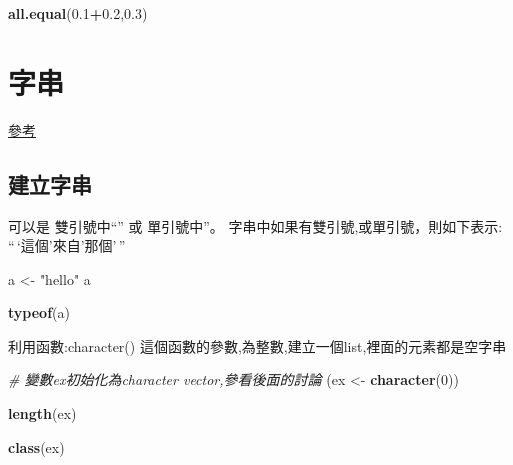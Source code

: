 \documentclass[]{book}
\newenvironment{Shaded}{\begin{snugshade}}{\end{snugshade}}
\newcommand{\KeywordTok}[1]{\textcolor[rgb]{0.13,0.29,0.53}{\textbf{#1}}}
\newcommand{\DecValTok}[1]{\textcolor[rgb]{0.00,0.00,0.81}{#1}}
\newcommand{\FloatTok}[1]{\textcolor[rgb]{0.00,0.00,0.81}{#1}}
\newcommand{\StringTok}[1]{\textcolor[rgb]{0.31,0.60,0.02}{#1}}
\newcommand{\CommentTok}[1]{\textcolor[rgb]{0.56,0.35,0.01}{\textit{#1}}}
\newcommand{\OperatorTok}[1]{\textcolor[rgb]{0.81,0.36,0.00}{\textbf{#1}}}
\newcommand{\NormalTok}[1]{#1}
\theoremstyle{definition}
\theoremstyle{definition}
\theoremstyle{definition}
\theoremstyle{remark}
\begin{document}
\begin{Shaded}
\begin{Highlighting}[]
\KeywordTok{all.equal}\NormalTok{(}\FloatTok{0.1}\OperatorTok{+}\FloatTok{0.2}\NormalTok{,}\FloatTok{0.3}\NormalTok{)}
\end{Highlighting}
\end{Shaded}

\section{字串}

\href{https://www.gastonsanchez.com/r4strings/chars.html}{參考}

\subsection{建立字串}

可以是 雙引號中``'' 或 單引號中''。
字串中如果有雙引號,或單引號，則如下表示:\\
``\,`這個'來自'那個'\,''

\begin{Shaded}
\begin{Highlighting}[]
\NormalTok{a <-}\StringTok{ "hello"}
\NormalTok{a}
\end{Highlighting}
\end{Shaded}

\begin{Shaded}
\begin{Highlighting}[]
\KeywordTok{typeof}\NormalTok{(a)}
\end{Highlighting}
\end{Shaded}

利用函數:character()
這個函數的參數,為整數,建立一個list,裡面的元素都是空字串

\begin{Shaded}
\begin{Highlighting}[]
\CommentTok{# 變數ex初始化為character vector,參看後面的討論}
\NormalTok{(ex <-}\StringTok{ }\KeywordTok{character}\NormalTok{(}\DecValTok{0}\NormalTok{))}
\end{Highlighting}
\end{Shaded}

\begin{Shaded}
\begin{Highlighting}[]
\KeywordTok{length}\NormalTok{(ex)}
\end{Highlighting}
\end{Shaded}

\begin{Shaded}
\begin{Highlighting}[]
\KeywordTok{class}\NormalTok{(ex)}
\end{Highlighting}
\end{Shaded}
\end{document}

